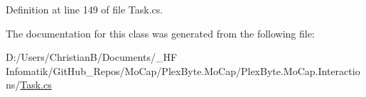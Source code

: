 Definition at line 149 of file Task.\+cs.



The documentation for this class was generated from the following file\+:\begin{DoxyCompactItemize}
\item 
D\+:/\+Users/\+Christian\+B/\+Documents/\+\_\+\+H\+F Infomatik/\+Git\+Hub\+\_\+\+Repos/\+Mo\+Cap/\+Plex\+Byte.\+Mo\+Cap/\+Plex\+Byte.\+Mo\+Cap.\+Interactions/\hyperlink{_task_8cs}{Task.\+cs}\end{DoxyCompactItemize}
